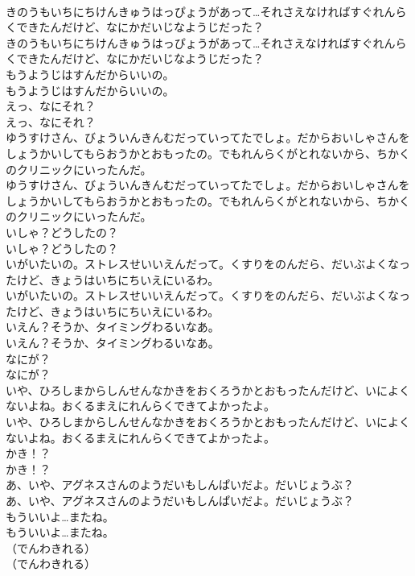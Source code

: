 \documentclass[8pt]{extreport}
\begin{document}
\begin{CJK}{UTF8}{min}
\\	きのうもいちにちけんきゅうはっぴょうがあって…それさえなければすぐれんらくできたんだけど、なにかだいじなようじだった？	
\\	きのうもいちにちけんきゅうはっぴょうがあって…それさえなければすぐれんらくできたんだけど、なにかだいじなようじだった？ 
\\	もうようじはすんだからいいの。	
\\	もうようじはすんだからいいの。 
\\	えっ、なにそれ？	
\\	えっ、なにそれ？ 
\\	ゆうすけさん、びょういんきんむだっていってたでしょ。だからおいしゃさんをしょうかいしてもらおうかとおもったの。でもれんらくがとれないから、ちかくのクリニックにいったんだ。	
\\	ゆうすけさん、びょういんきんむだっていってたでしょ。だからおいしゃさんをしょうかいしてもらおうかとおもったの。でもれんらくがとれないから、ちかくのクリニックにいったんだ。 
\\	いしゃ？どうしたの？	
\\	いしゃ？どうしたの？ 
\\	いがいたいの。ストレスせいいえんだって。くすりをのんだら、だいぶよくなったけど、きょうはいちにちいえにいるわ。	
\\	いがいたいの。ストレスせいいえんだって。くすりをのんだら、だいぶよくなったけど、きょうはいちにちいえにいるわ。 
\\	いえん？そうか、タイミングわるいなあ。	
\\	いえん？そうか、タイミングわるいなあ。 
\\	なにが？	
\\	なにが？ 
\\	いや、ひろしまからしんせんなかきをおくろうかとおもったんだけど、いによくないよね。おくるまえにれんらくできてよかったよ。	
\\	いや、ひろしまからしんせんなかきをおくろうかとおもったんだけど、いによくないよね。おくるまえにれんらくできてよかったよ。 
\\	かき！？	
\\	かき！？ 
\\	あ、いや、アグネスさんのようだいもしんぱいだよ。だいじょうぶ？	
\\	あ、いや、アグネスさんのようだいもしんぱいだよ。だいじょうぶ？ 
\\	もういいよ…またね。	
\\	もういいよ…またね。 
\\	（でんわきれる）	
\\	（でんわきれる） 

\end{CJK}
\end{document}
